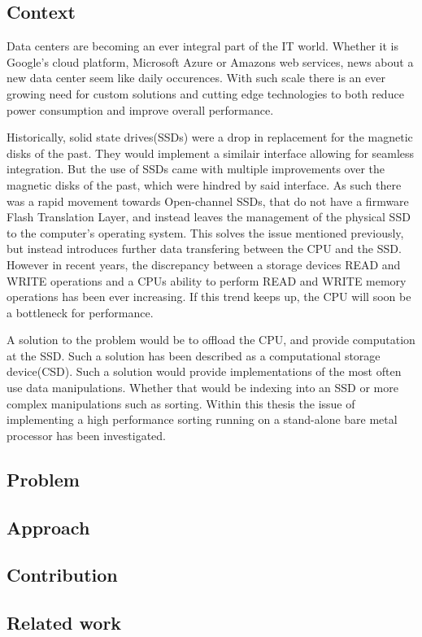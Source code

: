 \subsection{Context}\label{sec:context}
Data centers are becoming an ever integral part of the IT world. Whether it is
Google's cloud platform, Microsoft Azure or Amazons web services, news about a
new data center seem like daily occurences. With such scale there is an ever
growing need for custom solutions and cutting edge technologies to both reduce
power consumption and improve overall performance.

Historically, solid state drives(SSDs) were a drop in replacement for the
magnetic disks of the past. They would implement a similair interface allowing
for seamless integration. But the use of SSDs came with multiple improvements
over the magnetic disks of the past, which were hindred by said interface. As
such there was a rapid movement towards Open-channel SSDs, that do not have a
firmware Flash Translation Layer, and instead leaves the management of the
physical SSD to the computer's operating system. This solves the issue mentioned
previously, but instead introduces further data transfering between the CPU and
the SSD. However in recent years, the discrepancy between a storage devices
READ and WRITE operations and a CPUs ability to perform READ and WRITE memory
operations has been ever increasing. If this trend keeps up, the CPU will soon
be a bottleneck for performance.

A solution to the problem would be to offload the CPU, and provide computation
at the SSD. Such a solution has been described as a computational storage
device(CSD). Such a solution would provide implementations of the most often use
data manipulations. Whether that would be indexing into an SSD or more complex
manipulations such as sorting. Within this thesis the issue of implementing a
high performance sorting running on a stand-alone bare metal processor has been
investigated.


\subsection{Problem}



\subsection{Approach}

\subsection{Contribution}

\subsection{Related work}



